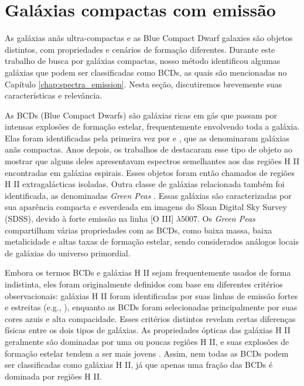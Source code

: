\section{Galáxias compactas com emissão}\label{sec:galaxias_compactas_emissao}
As galáxias anãs ultra-compactas e as Blue Compact Dwarf galaxies são objetos distintos, com propriedades e cenários de formação diferentes. Durante este trabalho de busca por galáxias compactas, nosso método identificou algumas galáxias que podem ser classificadas como BCDs, as quais são mencionadas no Capítulo \ref{chap:spectra_emission}. Nesta seção, discutiremos brevemente suas características e relevância.

As BCDs (Blue Compact Dwarfs) são galáxias ricas em gás que passam por intensas explosões de formação estelar, frequentemente envolvendo toda a galáxia. Elas foram identificadas pela primeira vez por \cite{Hardie_1956} e \cite{Zwicky_1961}, que as denominaram galáxias anãs compactas. Anos depois, os trabalhos de \cite{Sargent_1970} destacaram esse tipo de objeto ao mostrar que alguns deles apresentavam espectros semelhantes aos das regiões H II encontradas em galáxias espirais. Esses objetos foram então chamados de regiões H II extragalácticas isoladas. Outra classe de galáxias relacionada também foi identificada, as denominadas \textit{Green Peas} \citep{Cardamone_2009}. Essas galáxias são caracterizadas por sua aparência compacta e esverdeada em imagens do Sloan Digital Sky Survey (SDSS), devido à forte emissão na linha [O III] $\lambda5007$. Os \textit{Green Peas} compartilham várias propriedades com as BCDs, como baixa massa, baixa metalicidade e altas taxas de formação estelar, sendo considerados análogos locais de galáxias do universo primordial.

Embora os termos BCDs e galáxias H II sejam frequentemente usados de forma indistinta, eles foram originalmente definidos com base em diferentes critérios observacionais: galáxias H II foram identificadas por suas linhas de emissão fortes e estreitas (e.g., \citealt{Terlevich_1991}), enquanto as BCDs foram selecionadas principalmente por suas cores azuis e alta compacidade. Esses critérios distintos revelam certas diferenças físicas entre os dois tipos de galáxias. As propriedades ópticas das galáxias H II geralmente são dominadas por uma ou poucas regiões H II, e suas explosões de formação estelar tendem a ser mais jovens \citep{Telles_1995}. Assim, nem todas as BCDs podem ser classificadas como galáxias H II, já que apenas uma fração das BCDs é dominada por regiões H II.

